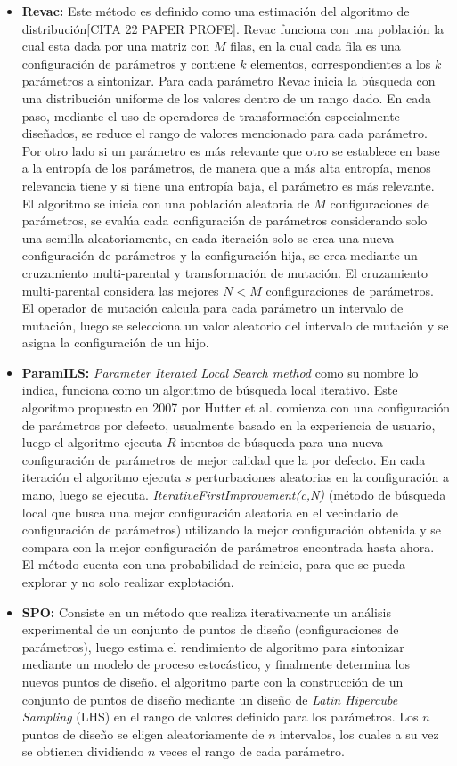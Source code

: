 \documentclass[letter, 10pt]{article}
\begin{document}
\begin{multicols}{2}
\begin{itemize}
    \item \textbf{Revac:} Este método es definido como una estimación del algoritmo de distribución[CITA 22 PAPER PROFE]. Revac funciona con una población la cual esta dada por una matriz con $M$ filas, en la cual cada fila es una configuración de parámetros y contiene $k$ elementos, correspondientes a los $k$ parámetros a sintonizar. Para cada parámetro Revac inicia la búsqueda con una distribución uniforme de los valores dentro de un rango dado. En cada paso, mediante el uso de operadores de transformación especialmente diseñados, se reduce el rango de valores mencionado para cada parámetro. Por otro lado si un parámetro es más relevante que otro se establece en base a la entropía de los parámetros, de manera que a más alta entropía, menos relevancia tiene y si tiene una entropía baja, el parámetro es más relevante. El algoritmo se inicia con una población aleatoria de $M$ configuraciones de parámetros, se evalúa cada configuración de parámetros considerando solo una semilla aleatoriamente, en cada iteración solo se crea una nueva configuración de parámetros y la configuración hija, se crea mediante un cruzamiento multi-parental y transformación de mutación. El cruzamiento multi-parental considera las mejores $N<M$ configuraciones de parámetros. El operador de mutación calcula para cada parámetro un intervalo de mutación, luego se selecciona un valor aleatorio del intervalo de mutación y se asigna la configuración de un hijo.
    \item \textbf{ParamILS:}
    \textit{Parameter Iterated Local Search method} como su nombre lo indica, funciona como un algoritmo de búsqueda local iterativo. Este algoritmo propuesto en 2007 por Hutter et al. \cite{Hutter2007AutomaticAC} comienza con una configuración de parámetros por defecto, usualmente basado en la experiencia de usuario, luego el algoritmo ejecuta $R$ intentos de búsqueda para una nueva configuración de parámetros de mejor calidad que la por defecto. En cada iteración el algoritmo ejecuta $s$ perturbaciones aleatorias en la configuración a mano, luego se ejecuta. \textit{IterativeFirstImprovement(c,N)} (método de búsqueda local que busca una mejor configuración aleatoria en el vecindario de configuración de parámetros) utilizando la mejor configuración obtenida y se compara con la mejor configuración de parámetros encontrada hasta ahora. El método cuenta con una probabilidad de reinicio, para que se pueda explorar y no solo realizar explotación.
    \item \textbf{SPO:}
    Consiste en un método que realiza iterativamente un análisis experimental de un conjunto de puntos de diseño (configuraciones de parámetros), luego estima el rendimiento de algoritmo para sintonizar mediante un modelo de proceso estocástico, y finalmente determina los nuevos puntos de diseño. el algoritmo parte con la construcción de un conjunto de puntos de diseño mediante un diseño de \textit{Latin Hipercube Sampling} (LHS) en el rango de valores definido para los parámetros. Los $n$ puntos de diseño se eligen aleatoriamente de $n$ intervalos, los cuales a su vez se obtienen dividiendo $n$ veces el rango de cada parámetro. 
\end{itemize}


\end{multicols}
\end{document}
